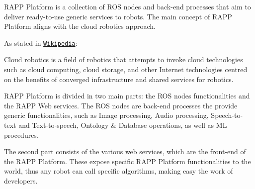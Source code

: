 R\-A\-P\-P Platform is a collection of R\-O\-S nodes and back-\/end processes that aim to deliver ready-\/to-\/use generic services to robots. The main concept of R\-A\-P\-P Platform aligns with the cloud robotics approach.

As stated in \href{https://en.wikipedia.org/wiki/Cloud_robotics}{\tt Wikipedia}\-:

\begin{quotation}


\end{quotation}
Cloud robotics is a field of robotics that attempts to invoke cloud technologies such as cloud computing, cloud storage, and other Internet technologies centred on the benefits of converged infrastructure and shared services for robotics. \begin{quotation}


\end{quotation}


R\-A\-P\-P Platform is divided in two main parts\-: the R\-O\-S nodes functionalities and the R\-A\-P\-P Web services. The R\-O\-S nodes are back-\/end processes the provide generic functionalities, such as Image processing, Audio processing, Speech-\/to-\/text and Text-\/to-\/speech, Ontology \& Database operations, as well as M\-L procedures.

The second part consists of the various web services, which are the front-\/end of the R\-A\-P\-P Platform. These expose specific R\-A\-P\-P Platform functionalities to the world, thus any robot can call specific algorithms, making easy the work of developers. 